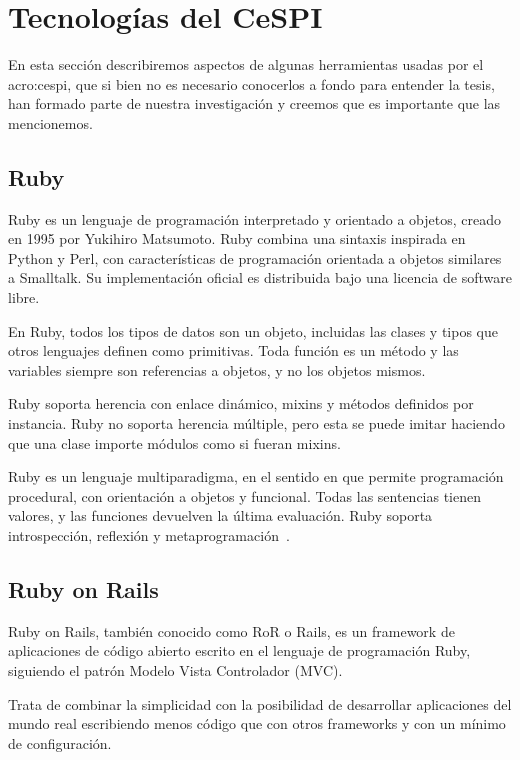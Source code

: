 \section{Tecnologías del CeSPI}
\label{anexo:A}

En esta sección describiremos aspectos de algunas herramientas usadas por el
\gls{acro:cespi}, que si bien no es necesario conocerlos a fondo para entender
la tesis, han formado parte de nuestra investigación y creemos que es
importante que las mencionemos.

\subsection{Ruby}

Ruby es un lenguaje de programación interpretado y orientado a objetos, creado
en 1995 por Yukihiro Matsumoto. Ruby combina una sintaxis inspirada en Python y
Perl, con características de programación orientada a objetos similares a
Smalltalk. Su implementación oficial es distribuida bajo una licencia de
software libre.

En Ruby, todos los tipos de datos son un objeto, incluidas las clases y tipos
que otros lenguajes definen como primitivas. Toda función es un método y las
variables siempre son referencias a objetos, y no los objetos mismos.

Ruby soporta herencia con enlace dinámico, mixins y métodos definidos por
instancia. Ruby no soporta herencia múltiple, pero esta se puede imitar
haciendo que una clase importe módulos como si fueran mixins.

Ruby es un lenguaje multiparadigma, en el sentido en que permite programación
procedural, con orientación a objetos y funcional. Todas las sentencias tienen
valores, y las funciones devuelven la última evaluación. Ruby soporta
introspección, reflexión y metaprogramación~\cite{ruby}.

\subsection{Ruby on Rails}

Ruby on Rails, también conocido como RoR o Rails, es un framework de
aplicaciones  de código abierto escrito en el lenguaje de programación Ruby,
siguiendo el patrón Modelo Vista Controlador (MVC).

Trata de combinar la simplicidad con la posibilidad de desarrollar aplicaciones
del mundo real escribiendo menos código que con otros frameworks y con un
mínimo de configuración.

